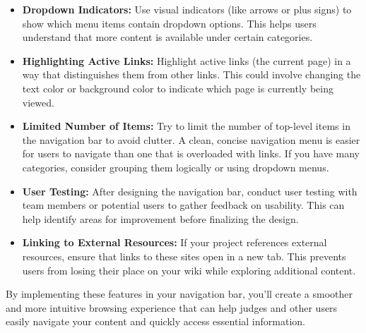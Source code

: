 \begin{itemize}
\item \textbf{Dropdown Indicators:}
Use visual indicators (like arrows or plus signs) to show which menu items contain dropdown options.
This helps users understand that more content is available under certain categories.

\item \textbf{Highlighting Active Links:}
Highlight active links (the current page) in a way that distinguishes them from other links.
This could involve changing the text color or background color to indicate which page is currently being viewed.

\item \textbf{Limited Number of Items:}
Try to limit the number of top-level items in the navigation bar to avoid clutter.
A clean, concise navigation menu is easier for users to navigate than one that is overloaded with links.
If you have many categories, consider grouping them logically or using dropdown menus.

\item \textbf{User Testing:}
After designing the navigation bar, conduct user testing with team members or potential users to gather feedback on usability.
This can help identify areas for improvement before finalizing the design.

\item \textbf{Linking to External Resources:}
If your project references external resources, ensure that links to these sites open in a new tab.
This prevents users from losing their place on your wiki while exploring additional content.
\end{itemize}
By implementing these features in your navigation bar, you'll create a smoother and more intuitive browsing experience that can help judges and other users easily navigate your content and quickly access essential information.



